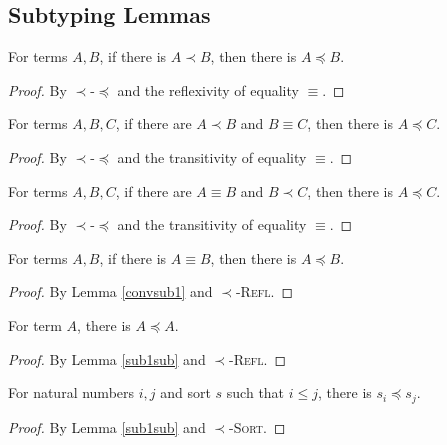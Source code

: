 \documentclass[sigplan,screen,review,anonymous]{acmart}
\newcommand{\rname}[1]{\textsc{\footnotesize #1}}
\begin{document}
\subsection{Subtyping Lemmas}

\begin{lemma}\label{sub1sub}
  For terms $A, B$, if there is $A \prec B$, then there is $A \preceq B$.
\end{lemma}
\begin{proof}
  By \rname{$\prec$-$\preceq$} and the reflexivity of equality $\equiv$.
\end{proof}

\begin{lemma}\label{sub1conv}
  For terms $A, B, C$, if there are $A \prec B$ and $B \equiv C$, then there is $A \preceq C$.
\end{lemma}
\begin{proof}
  By \rname{$\prec$-$\preceq$} and the transitivity of equality $\equiv$.
\end{proof}

\begin{lemma}\label{convsub1}
  For terms $A, B, C$, if there are $A \equiv B$ and $B \prec C$, then there is $A \preceq C$.
\end{lemma}
\begin{proof}
  By \rname{$\prec$-$\preceq$} and the transitivity of equality $\equiv$.
\end{proof}

\begin{lemma}\label{convsub}
  For terms $A, B$, if there is $A \equiv B$, then there is $A \preceq B$.
\end{lemma}
\begin{proof}
  By Lemma \ref{convsub1} and \rname{$\prec$-Refl}.
\end{proof}

\begin{lemma}\label{subrefl}
  For term $A$, there is $A \preceq A$.
\end{lemma}
\begin{proof}
  By Lemma \ref{sub1sub} and \rname{$\prec$-Refl}.
\end{proof}

\begin{lemma}\label{subprop}
  For natural numbers $i, j$ and sort $s$ such that $i \leq j$, there is $s_i \preceq s_j$.
\end{lemma}
\begin{proof}
  By Lemma \ref{sub1sub} and \rname{$\prec$-Sort}.
\end{proof}
\end{document}
